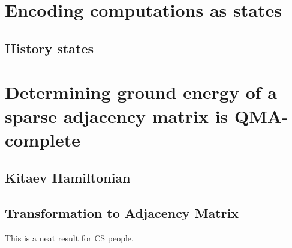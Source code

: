 % 

\section{Encoding computations as states}

\subsection{History states}

\section{Determining ground energy of a sparse adjacency matrix is QMA-complete}

\subsection{Kitaev Hamiltonian}

\subsection{Transformation to Adjacency Matrix}

This is a neat result for CS people.